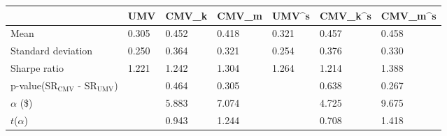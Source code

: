 \begin{tabular}{lllllll}
\toprule
 & UMV & CMV_k & CMV_m & UMV^s & CMV_k^s & CMV_m^s \\
\midrule
Mean & 0.305 & 0.452 & 0.418 & 0.321 & 0.457 & 0.458 \\
Standard deviation & 0.250 & 0.364 & 0.321 & 0.254 & 0.376 & 0.330 \\
Sharpe ratio & 1.221 & 1.242 & 1.304 & 1.264 & 1.214 & 1.388 \\
p-value(SR$_{\text{CMV}}$ - SR$_{\text{UMV}}$) &  & 0.464 & 0.305 &  & 0.638 & 0.267 \\
$\alpha$ (\$) &  & 5.883 & 7.074 &  & 4.725 & 9.675 \\
$t$($\alpha$) &  & 0.943 & 1.244 &  & 0.708 & 1.418 \\
\bottomrule
\end{tabular}
